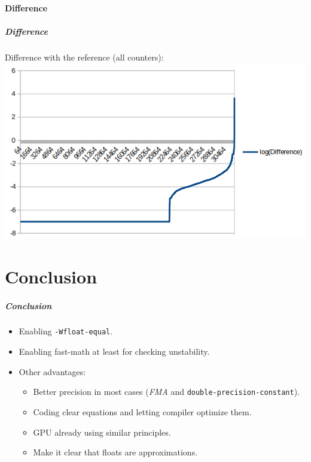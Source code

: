 \documentclass{beamer}
\begin{document}
\subsection{Difference}

\begin{frame}[fragile]
    \frametitle{Difference}

    Difference with the reference (all counters):
    \includegraphics[width=\textwidth]{fast-math_difference.png}
\end{frame}

\part{Conclusion}

\begin{frame}[fragile]
    \frametitle{Conclusion}

    \begin{itemize}
        \item Enabling \verb'-Wfloat-equal'.
        \item Enabling fast-math at least for checking unstability.
        \item Other advantages:
              \begin{itemize}
                  \item Better precision in most cases (\emph{FMA} and \verb'double-precision-constant').
                  \item Coding clear equations and letting compiler optimize them.
                  \item GPU already using similar principles.
                  \item Make it clear that floats are approximations.
              \end{itemize}
    \end{itemize}
\end{frame}
\end{document}
